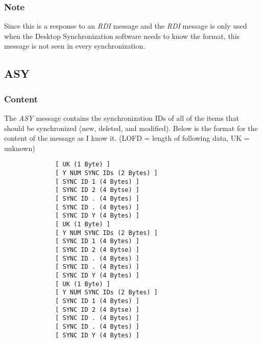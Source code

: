             \subsubsection{Note}

            Since this is a response to an \emph{RDI} message and the
            \emph{RDI} message is only used when the Desktop Synchronization
            software needs to know the format, this message is not seen in
            every synchronization.

        \subsection{ASY}

            \subsubsection{Content}

            The \emph{ASY} message contains the synchronization IDs of all of
            the items that should be synchronized (new, deleted, and
            modified). Below is the format for the content of the message as I
            know it. (LOFD = length of following data, UK = unknown)

            \begin{verbatim}
              [ UK (1 Byte) ]
              [ Y NUM SYNC IDs (2 Bytes) ]
              [ SYNC ID 1 (4 Bytes) ]
              [ SYNC ID 2 (4 Bytse) ]
              [ SYNC ID . (4 Bytes) ]
              [ SYNC ID . (4 Bytes) ]
              [ SYNC ID Y (4 Bytes) ]
              [ UK (1 Byte) ]
              [ Y NUM SYNC IDs (2 Bytes) ]
              [ SYNC ID 1 (4 Bytes) ]
              [ SYNC ID 2 (4 Bytse) ]
              [ SYNC ID . (4 Bytes) ]
              [ SYNC ID . (4 Bytes) ]
              [ SYNC ID Y (4 Bytes) ]
              [ UK (1 Byte) ]
              [ Y NUM SYNC IDs (2 Bytes) ]
              [ SYNC ID 1 (4 Bytes) ]
              [ SYNC ID 2 (4 Bytse) ]
              [ SYNC ID . (4 Bytes) ]
              [ SYNC ID . (4 Bytes) ]
              [ SYNC ID Y (4 Bytes) ]
            \end{verbatim}

